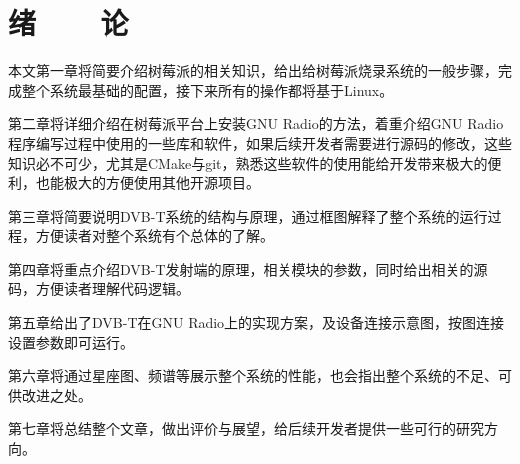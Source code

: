 \renewcommand{\baselinestretch}{1.5}
\fontsize{12pt}{13pt}\selectfont
{}
\chapter*{绪~~~~论}

\par 本文第一章将简要介绍树莓派的相关知识，给出给树莓派烧录系统的一般步骤，完成整个系统最基础的配置，接下来所有的操作都将基于Linux。
\par 第二章将详细介绍在树莓派平台上安装GNU Radio的方法，着重介绍GNU Radio程序编写过程中使用的一些库和软件，如果后续开发者需要进行源码的修改，这些知识必不可少，尤其是CMake与git，熟悉这些软件的使用能给开发带来极大的便利，也能极大的方便使用其他开源项目。
\par 第三章将简要说明DVB-T系统的结构与原理，通过框图解释了整个系统的运行过程，方便读者对整个系统有个总体的了解。
\par 第四章将重点介绍DVB-T发射端的原理，相关模块的参数，同时给出相关的源码，方便读者理解代码逻辑。
\par 第五章给出了DVB-T在GNU Radio上的实现方案，及设备连接示意图，按图连接设置参数即可运行。
\par 第六章将通过星座图、频谱等展示整个系统的性能，也会指出整个系统的不足、可供改进之处。
\par 第七章将总结整个文章，做出评价与展望，给后续开发者提供一些可行的研究方向。

\clearpage